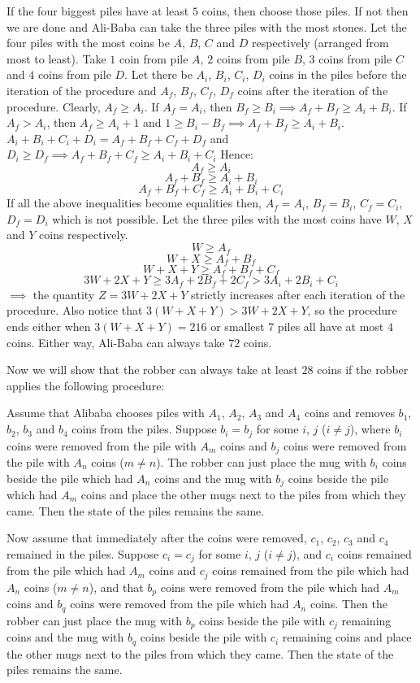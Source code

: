 \documentclass{article}
\begin{document}
\begin{enumerate}
If the four biggest piles have at least $5$ coins, then choose those piles. If not then we are done and Ali-Baba can take the three piles with the most stones.
Let the four piles with the most coins be $A$, $B$, $C$ and $D$ respectively (arranged from most to least).
Take $1$ coin from pile $A$, $2$ coins from pile $B$, $3$ coins from pile $C$ and $4$ coins from pile $D$.
Let there be $A_i$, $B_i$, $C_i$, $D_i$ coins in the piles before the iteration of the procedure and $A_f$, $B_f$, $C_f$, $D_f$ coins after the iteration of the procedure.
Clearly, $A_f \ge A_i$.
If $A_f = A_i$, then $B_f \ge B_i \implies A_f + B_f \ge A_i + B_i$.
If $A_f > A_i$, then $A_f \ge A_i + 1$ and $1 \ge B_i - B_f \implies A_f + B_f \ge A_i + B_i$.
$A_i + B_i + C_i + D_i = A_f + B_f + C_f + D_f$ and $D_i \ge D_f \implies A_f + B_f + C_f \ge A_i + B_i + C_i$
Hence:
$$A_f \ge A_i$$
$$A_f + B_f \ge A_i + B_i$$
$$A_f + B_f + C_f \ge A_i + B_i + C_i$$
If all the above inequalities become equalities then, $A_f = A_i$, $B_f = B_i$, $C_f = C_i$, $D_f = D_i$ which is not possible.
Let the three piles with the most coins have $W$, $X$ and $Y$ coins respectively.
$$W \ge A_f$$
$$W + X \ge A_f + B_f$$
$$W + X + Y \ge A_f + B_f + C_f$$
$$3W + 2X + Y \ge 3A_f + 2B_f + 2C_f > 3A_i + 2B_i + C_i$$
$\implies$ the quantity $Z = 3W + 2X + Y$ strictly increases after each iteration of the procedure. Also notice that $3(W + X + Y) > 3W + 2X + Y$, so the procedure ends either when $3(W + X + Y ) = 216$ or smallest $7$ piles all have at most $4$ coins. Either way, Ali-Baba can always take $72$ coins.

Now we will show that the robber can always take at least $28$ coins if the robber applies the following procedure:

Assume that Alibaba chooses piles with $A_1$, $A_2$, $A_3$ and $A_4$ coins and removes $b_1$, $b_2$, $b_3$ and $b_4$ coins from the piles. Suppose $b_i = b_j$ for some $i$, $j$ ($i \ne j$), where $b_i$ coins were removed from the pile with $A_m$ coins and $b_j$ coins were removed from the pile with $A_n$ coins ($m \ne n$). The robber can just place the mug with $b_i$ coins beside the pile which had $A_n$ coins and the mug with $b_j$ coins beside the pile which had $A_m$ coins and place the other mugs next to the piles from which they came. Then the state of the piles remains the same.

Now assume that immediately after the coins were removed, $c_1$, $c_2$, $c_3$ and $c_4$ remained in the piles. Suppose $c_i = c_j$ for some $i$, $j$ ($i \ne j$), and $c_i$ coins remained from the pile which had $A_m$ coins and $c_j$ coins remained from the pile which had $A_n$ coins ($m \ne n$), and that $b_p$ coins were removed from the pile which had $A_m$ coins and $b_q$ coins were removed from the pile which had $A_n$ coins. Then the robber can just place the mug with $b_p$ coins beside the pile with $c_j$ remaining coins and the mug with $b_q$ coins beside the pile with $c_i$ remaining coins and place the other mugs next to the piles from which they came. Then the state of the piles remains the same.


\end{enumerate}
\end{document}
